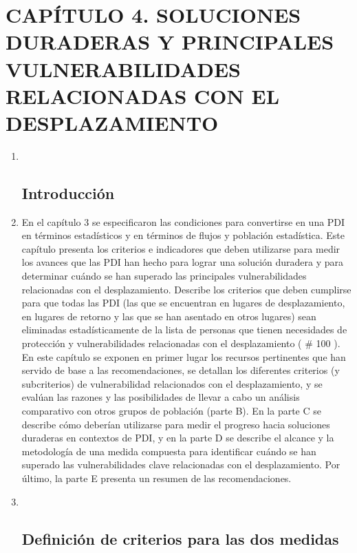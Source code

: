 \documentclass[
]{book}
\begin{document}
\hypertarget{capuxedtulo-4.-soluciones-duraderas-y-principales-vulnerabilidades-relacionadas-con-el-desplazamiento}{%
\chapter{CAPÍTULO 4. SOLUCIONES DURADERAS Y PRINCIPALES VULNERABILIDADES RELACIONADAS CON EL DESPLAZAMIENTO}\label{capuxedtulo-4.-soluciones-duraderas-y-principales-vulnerabilidades-relacionadas-con-el-desplazamiento}}

\begin{enumerate}
\def\labelenumi{\arabic{enumi}.}
\item ~
  \hypertarget{introducciuxf3n-2}{%
  \section{Introducción}\label{introducciuxf3n-2}}
\item
  En el capítulo 3 se especificaron las condiciones para convertirse en una PDI en términos estadísticos y en términos de flujos y población estadística. Este capítulo presenta los criterios e indicadores que deben utilizarse para medir los avances que las PDI han hecho para lograr una solución duradera y para determinar cuándo se han superado las principales vulnerabilidades relacionadas con el desplazamiento. Describe los criterios que deben cumplirse para que todas las PDI (las que se encuentran en lugares de desplazamiento, en lugares de retorno y las que se han asentado en otros lugares) sean eliminadas estadísticamente de la lista de personas que tienen necesidades de protección y vulnerabilidades relacionadas con el desplazamiento (
  \# 100
  ). En este capítulo se exponen en primer lugar los recursos pertinentes que han servido de base a las recomendaciones, se detallan los diferentes criterios (y subcriterios) de vulnerabilidad relacionados con el desplazamiento, y se evalúan las razones y las posibilidades de llevar a cabo un análisis comparativo con otros grupos de población (parte B). En la parte C se describe cómo deberían utilizarse para medir el progreso hacia soluciones duraderas en contextos de PDI, y en la parte D se describe el alcance y la metodología de una medida compuesta para identificar cuándo se han superado las vulnerabilidades clave relacionadas con el desplazamiento. Por último, la parte E presenta un resumen de las recomendaciones.
\item ~
  \hypertarget{definiciuxf3n-de-criterios-para-las-dos-medidas}{%
  \section{Definición de criterios para las dos medidas}\label{definiciuxf3n-de-criterios-para-las-dos-medidas}}


\end{enumerate}
\end{document}

